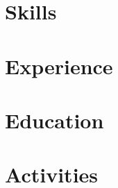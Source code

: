 \documentclass[letter,10pt]{article}
\begin{document}
\section{Skills}


\section{Experience}


\section{Education}



\section{Activities}

\end{document}
